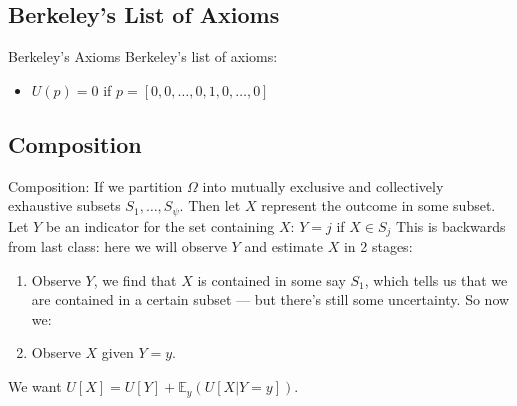 \subsection{Berkeley’s List of Axioms}

\begin{defn}{Berkeley’s Axioms}
Berkeley’s list of axioms:
\begin{itemize}
    \item \( U(p)=0 \) if \( p = [0, 0, \ldots, 0, 1, 0, \ldots, 0] \)
\end{itemize}
\end{defn}

\subsection{Composition}

Composition: If we partition \( \Omega \) into mutually exclusive and collectively exhaustive subsets \( S_1, \ldots, S_\psi \). 
Then let \( X \) represent the outcome in some subset.
Let \( Y \) be an indicator for the set containing \( X \): \( Y=j \) if \( X \in S_j \)
This is backwards from last class: here we will observe \( Y \) and estimate \( X \) in 2 stages:
\begin{enumerate}
    \item Observe \( Y \), we find that \( X \) is contained in some say \( S_1 \), which tells us that we are contained in a certain subset — but there’s still some uncertainty. So now we:
    \item Observe \( X \) given \( Y=y \).
\end{enumerate}
We want \( U[X] = U[Y] + \mathbb{E}_y(U[X | Y=y]) \).

